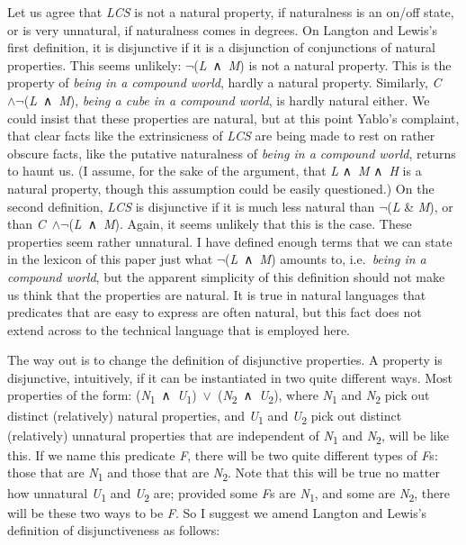 \documentclass[
  10pt,
  letterpaper,
  DIV=11,
  numbers=noendperiod,
  twoside]{scrartcl}
\begin{document}
Let us agree that \emph{LCS} is not a natural property, if naturalness
is an on/off state, or is very unnatural, if naturalness comes in
degrees. On Langton and Lewis's first definition, it is disjunctive if
it is a disjunction of conjunctions of natural properties. This seems
unlikely: \({\neg}\)(\emph{L}~∧~\emph{M}) is not a natural property.
This is the property of \emph{being in a compound world}, hardly a
natural property. Similarly,
\emph{C}~\(\wedge \neg\)(\emph{L}~∧~\emph{M}), \emph{being a cube in a
compound world}, is hardly natural either. We could insist that these
properties are natural, but at this point Yablo's complaint, that clear
facts like the extrinsicness of \emph{LCS} are being made to rest on
rather obscure facts, like the putative naturalness of \emph{being in a
compound world}, returns to haunt us. (I assume, for the sake of the
argument, that \emph{L} ∧~\emph{M} ∧~\emph{H} is a natural property,
though this assumption could be easily questioned.) On the second
definition, \emph{LCS} is disjunctive if it is much less natural than
\({\neg}\)(\emph{L} \& \emph{M}), or than
\emph{C}~\(\wedge \neg\)(\emph{L}~∧~\emph{M}). Again, it seems unlikely
that this is the case. These properties seem rather unnatural. I have
defined enough terms that we can state in the lexicon of this paper just
what \({\neg}\)(\emph{L}~∧~\emph{M}) amounts to, i.e.~\emph{being in a
compound world}, but the apparent simplicity of this definition should
not make us think that the properties are natural. It is true in natural
languages that predicates that are easy to express are often natural,
but this fact does not extend across to the technical language that is
employed here.

The way out is to change the definition of disjunctive properties. A
property is disjunctive, intuitively, if it can be instantiated in two
quite different ways. Most properties of the form:
(\emph{N}\textsubscript{1}~∧~\emph{U}\textsubscript{1})~\({\vee}\)~(\emph{N}\textsubscript{2}~∧~\emph{U}\textsubscript{2}),
where \emph{N}\textsubscript{1} and \emph{N}\textsubscript{2} pick out
distinct (relatively) natural properties, and \emph{U}\textsubscript{1}
and \emph{U}\textsubscript{2} pick out distinct (relatively) unnatural
properties that are independent of \emph{N}\textsubscript{1} and
\emph{N}\textsubscript{2}, will be like this. If we name this predicate
\emph{F}, there will be two quite different types of \emph{F}s: those
that are \emph{N}\textsubscript{1} and those that are
\emph{N}\textsubscript{2}. Note that this will be true no matter how
unnatural \emph{U}\textsubscript{1} and \emph{U}\textsubscript{2} are;
provided some \emph{F}s are \emph{N}\textsubscript{1}, and some are
\emph{N}\textsubscript{2}, there will be these two ways to be \emph{F}.
So I suggest we amend Langton and Lewis's definition of disjunctiveness
as follows:
\end{document}
